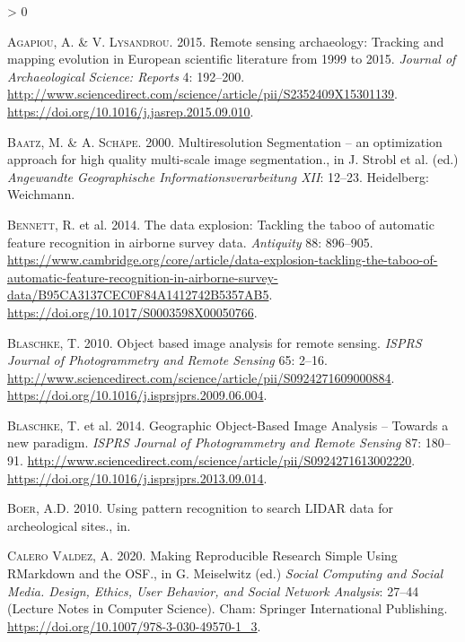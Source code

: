 \documentclass[
  12pt,
]{article}
\newlength{\cslhangindent}
\newenvironment{CSLReferences}[2] %
 {%
  \setlength{\parindent}{0pt}
  \ifodd #1 \everypar{\setlength{\hangindent}{\cslhangindent}}\ignorespaces\fi
  \ifnum #2 > 0
  \setlength{\parskip}{#2\baselineskip}
  \fi
 }%
 {}
\begin{document}
\hypertarget{refs}{}
\begin{CSLReferences}{1}{0}
\leavevmode\hypertarget{ref-agapiouRemoteSensingArchaeology2015}{}%
\textsc{Agapiou}, A. \& V. \textsc{Lysandrou}. 2015. Remote sensing archaeology: {Tracking} and mapping evolution in {European} scientific literature from 1999 to 2015. \emph{Journal of Archaeological Science: Reports} 4: 192--200. \url{http://www.sciencedirect.com/science/article/pii/S2352409X15301139}. \url{https://doi.org/10.1016/j.jasrep.2015.09.010}.

\leavevmode\hypertarget{ref-baatzMultiresolutionSegmentationOptimization2000a}{}%
\textsc{Baatz}, M. \& A. \textsc{Schäpe}. 2000. Multiresolution {Segmentation} -- an optimization approach for high quality multi-scale image segmentation., in J. Strobl et al. (ed.) \emph{Angewandte {Geographische} {Informationsverarbeitung} {XII}}: 12--23. Heidelberg: Weichmann.

\leavevmode\hypertarget{ref-bennettDataExplosionTackling2014a}{}%
\textsc{Bennett}, R. et al. 2014. The data explosion: Tackling the taboo of automatic feature recognition in airborne survey data. \emph{Antiquity} 88: 896--905. \url{https://www.cambridge.org/core/article/data-explosion-tackling-the-taboo-of-automatic-feature-recognition-in-airborne-survey-data/B95CA3137CEC0F84A1412742B5357AB5}. \url{https://doi.org/10.1017/S0003598X00050766}.

\leavevmode\hypertarget{ref-blaschkeObjectBasedImage2010}{}%
\textsc{Blaschke}, T. 2010. Object based image analysis for remote sensing. \emph{ISPRS Journal of Photogrammetry and Remote Sensing} 65: 2--16. \url{http://www.sciencedirect.com/science/article/pii/S0924271609000884}. \url{https://doi.org/10.1016/j.isprsjprs.2009.06.004}.

\leavevmode\hypertarget{ref-blaschkeGeographicObjectBasedImage2014a}{}%
\textsc{Blaschke}, T. et al. 2014. Geographic {Object}-{Based} {Image} {Analysis} -- {Towards} a new paradigm. \emph{ISPRS Journal of Photogrammetry and Remote Sensing} 87: 180--91. \url{http://www.sciencedirect.com/science/article/pii/S0924271613002220}. \url{https://doi.org/10.1016/j.isprsjprs.2013.09.014}.

\leavevmode\hypertarget{ref-Boer2010UsingPR}{}%
\textsc{Boer}, A.D. 2010. Using pattern recognition to search {LIDAR} data for archeological sites., in.

\leavevmode\hypertarget{ref-calerovaldezMakingReproducibleResearch2020}{}%
\textsc{Calero Valdez}, A. 2020. Making {Reproducible} {Research} {Simple} {Using} {RMarkdown} and the {OSF}., in G. Meiselwitz (ed.) \emph{Social {Computing} and {Social} {Media}. {Design}, {Ethics}, {User} {Behavior}, and {Social} {Network} {Analysis}}: 27--44 (Lecture {Notes} in {Computer} {Science}). Cham: Springer International Publishing. \url{https://doi.org/10.1007/978-3-030-49570-1_3}.


\end{CSLReferences}
\end{document}
